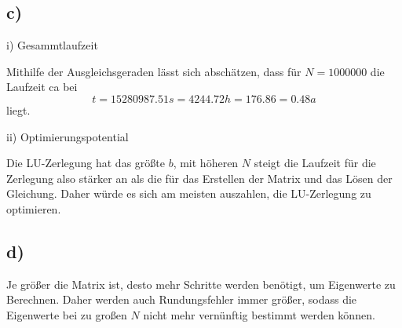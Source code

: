   \subsection*{c)}

    \noindent i) Gesammtlaufzeit

    \noindent Mithilfe der Ausgleichsgeraden lässt sich abschätzen, dass für $N=1000000$
    die Laufzeit ca bei
    $$t= 15280987.51 s =  4244.72 h = 176.86 = 0.48 a$$
    liegt.

    \noindent ii) Optimierungspotential

    \noindent Die LU-Zerlegung hat das größte $b$, mit höheren $N$ steigt die Laufzeit für die Zerlegung
    also stärker an als die für das Erstellen der Matrix und das Lösen der Gleichung. Daher
    würde es sich am meisten auszahlen, die LU-Zerlegung zu optimieren.


  \subsection*{d)}

    \noindent Je größer die Matrix ist, desto mehr Schritte werden benötigt, um Eigenwerte zu Berechnen. Daher
    werden auch Rundungsfehler immer größer, sodass die Eigenwerte bei zu großen $N$ nicht mehr vernünftig bestimmt
    werden können.
